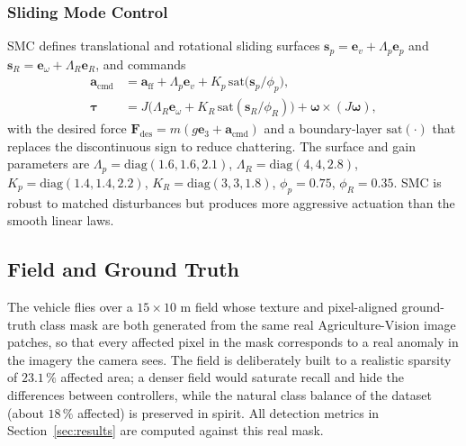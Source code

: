 \documentclass[12pt,a4paper]{article}
\begin{document}
\subsubsection{Sliding Mode Control}
SMC defines translational and rotational sliding surfaces
$\mathbf{s}_p=\mathbf{e}_v+\Lambda_p\mathbf{e}_p$ and
$\mathbf{s}_R=\mathbf{e}_\omega+\Lambda_R\mathbf{e}_R$, and commands
\begin{equation}
    \begin{aligned}
        \mathbf{a}_{\mathrm{cmd}} &= \mathbf{a}_{\mathrm{ff}} + \Lambda_p\mathbf{e}_v
            + K_p\,\mathrm{sat}\!\big(\mathbf{s}_p/\phi_p\big), \\
        \bm{\tau} &= J\big(\Lambda_R\mathbf{e}_\omega + K_R\,\mathrm{sat}(\mathbf{s}_R/\phi_R)\big)
            + \bm{\omega}\times(J\bm{\omega}),
    \end{aligned}
    \label{eq:smc}
\end{equation}
with the desired force $\mathbf{F}_{\mathrm{des}}=m(g\mathbf{e}_3+\mathbf{a}_{\mathrm{cmd}})$
and a boundary-layer $\mathrm{sat}(\cdot)$ that replaces the discontinuous sign to reduce
chattering. The surface and gain parameters are $\Lambda_p=\mathrm{diag}(1.6,1.6,2.1)$,
$\Lambda_R=\mathrm{diag}(4,4,2.8)$, $K_p=\mathrm{diag}(1.4,1.4,2.2)$,
$K_R=\mathrm{diag}(3,3,1.8)$, $\phi_p=0.75$, $\phi_R=0.35$. SMC is robust to matched
disturbances but produces more aggressive actuation than the smooth linear laws.

\subsection{Field and Ground Truth}
The vehicle flies over a $15\times10$ m field whose texture and pixel-aligned
ground-truth class mask are both generated from the same real Agriculture-Vision
image patches, so that every affected pixel in the mask corresponds to a real
anomaly in the imagery the camera sees. The field is deliberately built to a
realistic sparsity of $23.1\,\%$ affected area; a denser field would saturate recall
and hide the differences between controllers, while the natural class balance of the
dataset (about $18\,\%$ affected) is preserved in spirit. All detection metrics in
Section~\ref{sec:results} are computed against this real mask.
\end{document}
